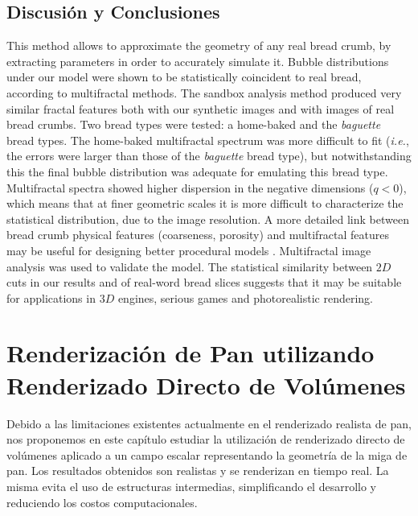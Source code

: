 \documentclass[spanish,a4paper,openright,11pt]{book}
\begin{document}

\section{Discusi\'on y Conclusiones}
This method allows to approximate the geometry of any real bread crumb, by 
extracting parameters in order to accurately simulate it.
Bubble distributions under our model were shown to be statistically coincident to real bread, according to multifractal methods.
The sandbox analysis method produced very similar fractal features both with our synthetic images and with images of real bread crumbs.
Two bread types were tested: a home-baked and the {\em baguette } bread types.
The home-baked multifractal spectrum was more difficult to fit ({\em i.e.}, the errors were larger than those of the {\em baguette} bread type), but notwithstanding this the final bubble distribution was adequate for emulating this bread type.
Multifractal spectra showed higher dispersion in the negative dimensions ($q < 0$), which means that at finer geometric scales it is more difficult to characterize the statistical distribution, due to the image resolution.
A more detailed link between bread crumb physical features (coarseness, porosity) and multifractal features may be useful for designing better procedural models \cite{Baravalle2012}.
Multifractal image analysis was used to validate the model.
The statistical similarity between $2D$ cuts in our results and of real-word bread slices suggests that it may be suitable for applications in $3D$ engines, serious games \cite{Susi2007} and photorealistic rendering. 



\chapter{Renderización de Pan utilizando Renderizado Directo de Volúmenes}
Debido a las limitaciones existentes actualmente en el renderizado realista de pan, nos proponemos en este capítulo estudiar la utilización de renderizado directo de volúmenes aplicado a un campo escalar representando la geometría de la miga de pan. Los resultados obtenidos son realistas y se renderizan en tiempo real. La misma evita el uso de estructuras intermedias, simplificando el desarrollo y reduciendo los costos computacionales.
\end{document}
